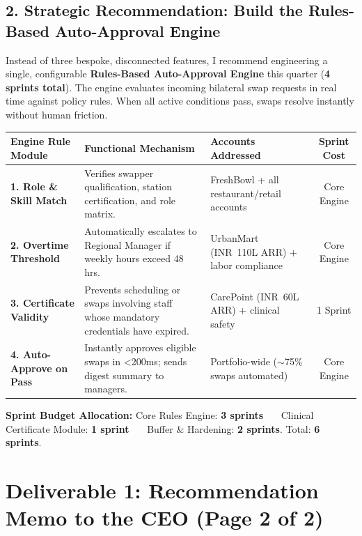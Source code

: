 \documentclass[10pt,a4paper]{article}
\newcommand{\INR}{INR~}
\begin{document}
\subsection*{2. Strategic Recommendation: Build the Rules-Based Auto-Approval Engine}
Instead of three bespoke, disconnected features, I recommend engineering a single, configurable \textbf{Rules-Based Auto-Approval Engine} this quarter (\textbf{4 sprints total}). The engine evaluates incoming bilateral swap requests in real time against policy rules. When all active conditions pass, swaps resolve instantly without human friction.

\begin{table}[h!]
\centering
\footnotesize
\renewcommand{\arraystretch}{1.2}
\begin{tabularx}{\textwidth}{p{3.4cm}Xp{4.2cm}c}
\toprule
\textbf{Engine Rule Module} & \textbf{Functional Mechanism} & \textbf{Accounts Addressed} & \textbf{Sprint Cost} \\
\midrule
\textbf{1. Role \& Skill Match} & Verifies swapper qualification, station certification, and role matrix. & FreshBowl + all restaurant/retail accounts & Core Engine \\
\textbf{2. Overtime Threshold} & Automatically escalates to Regional Manager if weekly hours exceed 48 hrs. & UrbanMart (\INR 110L ARR) + labor compliance & Core Engine \\
\textbf{3. Certificate Validity} & Prevents scheduling or swaps involving staff whose mandatory credentials have expired. & CarePoint (\INR 60L ARR) + clinical safety & 1 Sprint \\
\textbf{4. Auto-Approve on Pass} & Instantly approves eligible swaps in <200ms; sends digest summary to managers. & Portfolio-wide ($\sim$75\% swaps automated) & Core Engine \\
\bottomrule
\end{tabularx}
\end{table}

\vspace{-1.5mm}
\noindent
\textbf{Sprint Budget Allocation:} Core Rules Engine: \textbf{3 sprints} \ \textbar\ \ Clinical Certificate Module: \textbf{1 sprint} \ \textbar\ \ Buffer \& Hardening: \textbf{2 sprints}. Total: \textbf{6 sprints}.

\newpage
\section*{Deliverable 1: Recommendation Memo to the CEO (Page 2 of 2)}
\end{document}
